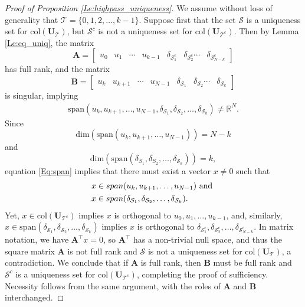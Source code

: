 \documentclass[journal, 10pt]{IEEEtran}
\begin{document}
\begin{proof}[Proof of Proposition \ref{Le:highpass_uniqueness}]
We assume without loss of generality that ${\mathcal T}=\{0,1,2,\ldots,k-1\}$. 
Suppose first that the set $\mathcal{S}$ is a uniqueness set for $\mbox{col}({\mathbf{U}}_{\mathcal T})$, but $\mathcal{S}^c$ is not a uniqueness set for $\mbox{col}({\mathbf{U}}_{{\mathcal T}^c})$. Then by Lemma \ref{Le:eq_uniq}, the matrix $$\mathbf{A}=
 \left[ \begin{array}{cccccccc}
u_{0} & u_{1} & \cdots & u_{k-1} & \delta_{{\mathcal{S}}^c_1} & \delta_{{\mathcal{S}}^c_2} \cdots & \delta_{{\mathcal{S}}^c_{N-k}} \end{array} \right]$$
has full rank, and the matrix $$\mathbf{B}=
 \left[ \begin{array}{cccccccc}
u_{k} & u_{k+1} & \cdots & u_{N-1} & \delta_{\mathcal{S}_{1}} & \delta_{\mathcal{S}_{2}} \cdots & \delta_{\mathcal{S}_k} \end{array} \right]$$
is singular, implying
\begin{align}\label{Eq:span}
\mbox{span}(u_{k}, u_{k+1},\ldots, u_{N-1}, \delta_{\mathcal{S}_{1}}, \delta_{\mathcal{S}_{2}}, \ldots, \delta_{\mathcal{S}_k}) \neq \mathbb{R}^N.
\end{align}
Since 
$$\mbox{dim}(\mbox{span}(u_{k}, u_{k+1},\ldots, u_{N-1}))=N-k$$ and $$\mbox{dim}(\mbox{span}(\delta_{S_{1}}, \delta_{S_{2}}, \ldots, \delta_{\mathcal{S}_k}))=k,$$ equation 
\eqref{Eq:span} implies that
there must exist a vector $x \neq 0$ such that 
\begin{align*}
&x \in  \mbox{span}(u_{k}, u_{k+1},\ldots, u_{N-1})  \hbox{ and } \\
& x \in \mbox{span}(\delta_{\mathcal{S}_{1}}, \delta_{\mathcal{S}_{2}}, \ldots, \delta_{\mathcal{S}_{k}}).\end{align*}
Yet, $x \in \mbox{col}({\mathbf{U}}_{{\mathcal T}^c})$ implies $x$ is orthogonal to  $u_0, u_1, \ldots, u_{k-1}$, and, similarly, 
$x \in \mbox{span}(\delta_{\mathcal{S}_{1}}, \delta_{\mathcal{S}_{2}}, \ldots, \delta_{\mathcal{S}_{k}})$ implies $x$ is orthogonal to $\delta_{\mathcal{S}^c_{1}}, \delta_{\mathcal{S}^c_{2}}, \ldots, \delta_{\mathcal{S}^c_{N-k}}.$
In matrix notation, we have $\mathbf{A}^{\top}x=0$, so $\mathbf{A}^{\top}$ has a non-trivial null space, and thus the square matrix $\mathbf{A}$ is not full rank and $\mathcal{S}$ is not a uniqueness set for $\mbox{col}({\mathbf{U}}_{\mathcal T})$, a contradiction. We conclude that if $\mathbf{A}$ is full rank, then $\mathbf{B}$ must be full rank and $\mathcal{S}^c$ is a uniqueness set for $\mbox{col}({\mathbf{U}}_{{\mathcal T}^c})$, completing the proof of sufficiency. Necessity follows from the same argument, with the roles of $\mathbf{A}$ and $\mathbf{B}$ interchanged.
\end{proof}
\end{document}
